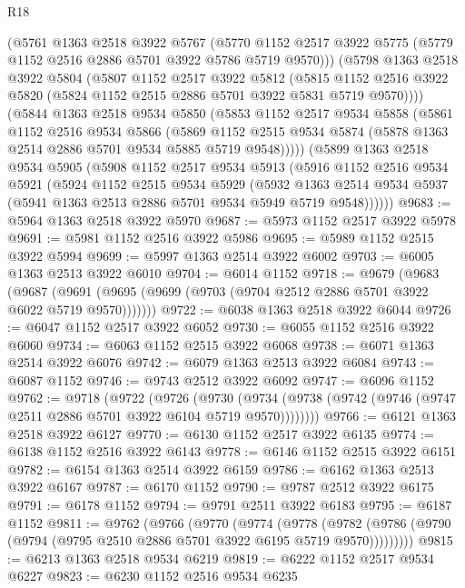 \begin{lexlean}{R18}
\begin{coremodule}
{{{{{{{{{{{{{{{{{{{    (@5761
      @1363
      @2518
      @3922
      @5767
      (@5770 @1152 @2517 @3922 @5775 (@5779 @1152 @2516 @2886 @5701 @3922 @5786 @5719 @9570)))
    (@5798
      @1363
      @2518
      @3922
      @5804
      (@5807
        @1152
        @2517
        @3922
        @5812
        (@5815 @1152 @2516 @3922 @5820 (@5824 @1152 @2515 @2886 @5701 @3922 @5831 @5719 @9570))))
    (@5844
      @1363
      @2518
      @9534
      @5850
      (@5853
        @1152
        @2517
        @9534
        @5858
        (@5861
          @1152
          @2516
          @9534
          @5866
          (@5869 @1152 @2515 @9534 @5874 (@5878 @1363 @2514 @2886 @5701 @9534 @5885 @5719 @9548)))))
    (@5899
      @1363
      @2518
      @9534
      @5905
      (@5908
        @1152
        @2517
        @9534
        @5913
        (@5916
          @1152
          @2516
          @9534
          @5921
          (@5924
            @1152
            @2515
            @9534
            @5929
            (@5932
              @1363
              @2514
              @9534
              @5937
              (@5941 @1363 @2513 @2886 @5701 @9534 @5949 @5719 @9548))))))
@9683 := @5964 @1363 @2518 @3922 @5970
@9687 := @5973 @1152 @2517 @3922 @5978
@9691 := @5981 @1152 @2516 @3922 @5986
@9695 := @5989 @1152 @2515 @3922 @5994
@9699 := @5997 @1363 @2514 @3922 @6002
@9703 := @6005 @1363 @2513 @3922 @6010
@9704 := @6014 @1152
@9718 := @9679
    (@9683
      (@9687 (@9691 (@9695 (@9699 (@9703 (@9704 @2512 @2886 @5701 @3922 @6022 @5719 @9570)))))))
@9722 := @6038 @1363 @2518 @3922 @6044
@9726 := @6047 @1152 @2517 @3922 @6052
@9730 := @6055 @1152 @2516 @3922 @6060
@9734 := @6063 @1152 @2515 @3922 @6068
@9738 := @6071 @1363 @2514 @3922 @6076
@9742 := @6079 @1363 @2513 @3922 @6084
@9743 := @6087 @1152
@9746 := @9743 @2512 @3922 @6092
@9747 := @6096 @1152
@9762 := @9718
    (@9722
      (@9726
        (@9730 (@9734 (@9738 (@9742 (@9746 (@9747 @2511 @2886 @5701 @3922 @6104 @5719 @9570))))))))
@9766 := @6121 @1363 @2518 @3922 @6127
@9770 := @6130 @1152 @2517 @3922 @6135
@9774 := @6138 @1152 @2516 @3922 @6143
@9778 := @6146 @1152 @2515 @3922 @6151
@9782 := @6154 @1363 @2514 @3922 @6159
@9786 := @6162 @1363 @2513 @3922 @6167
@9787 := @6170 @1152
@9790 := @9787 @2512 @3922 @6175
@9791 := @6178 @1152
@9794 := @9791 @2511 @3922 @6183
@9795 := @6187 @1152
@9811 := @9762
    (@9766
      (@9770
        (@9774
          (@9778
            (@9782 (@9786 (@9790 (@9794 (@9795 @2510 @2886 @5701 @3922 @6195 @5719 @9570)))))))))
@9815 := @6213 @1363 @2518 @9534 @6219
@9819 := @6222 @1152 @2517 @9534 @6227
@9823 := @6230 @1152 @2516 @9534 @6235
}}}}}}}}}}}}}}}}}}}
\end{coremodule}
\end{lexlean}
